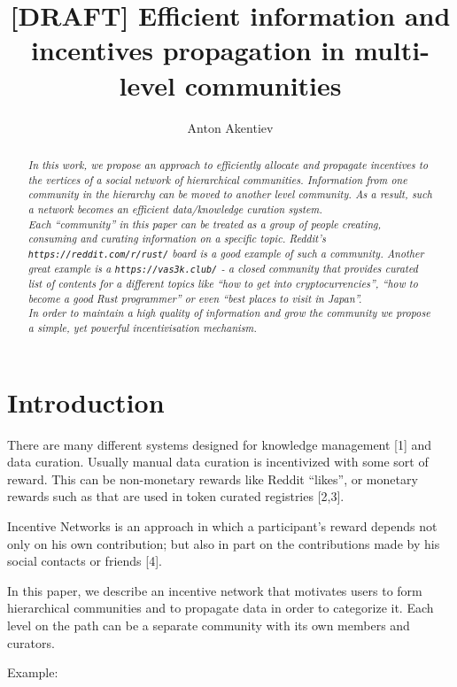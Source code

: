 \documentclass[10pt,a4paper]{article}
\title{[DRAFT] Efficient information and incentives propagation in multi-level communities}
\author{Anton Akentiev
    \affiliation{Anytype Labs\\
    \url{antonkent@anytype.io}
    }
}
\begin{document}
\maketitle

\begin{abstract}
{\it
In this work, we propose an approach to efficiently allocate and propagate incentives to the vertices of a social network of hierarchical communities. Information from one community in the hierarchy can be moved to another level community. As a result, such a network becomes an efficient data/knowledge curation system.\\

Each “community” in this paper can be treated as a group of people creating, consuming and curating information on a specific topic. Reddit’s \verb+https://reddit.com/r/rust/+ board is a good example of such a community. Another great example is a \verb+https://vas3k.club/+ - a closed community that provides curated list of contents for a different topics like “how to get into cryptocurrencies”, “how to become a good Rust programmer” or even “best places to visit in Japan”.\\

In order to maintain a high quality of information and grow the community we propose a simple, yet powerful incentivisation mechanism.
}
\end{abstract}

\section{Introduction}

There are many different systems designed for knowledge management [1] and data curation. Usually manual data curation is incentivized with some sort of reward. This can be non-monetary rewards like Reddit “likes”, or monetary rewards such as that are used in token curated registries [2,3].

Incentive Networks is an approach in which a participant’s reward depends not only on his own contribution; but also in part on the contributions made by his social contacts or friends [4].

In this paper, we describe an incentive network that motivates users to form hierarchical communities and to propagate data in order to categorize it. Each level on the path can be a separate community with its own members and curators.\newline

Example:
\end{document}

